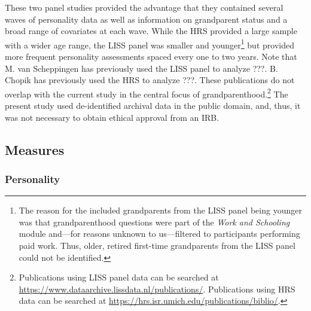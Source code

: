 \documentclass[
  english,
  man, noextraspace]{apa7}
\begin{document}
These two panel studies provided the advantage that they contained several waves of personality data as well as information on grandparent status and a broad range of covariates at each wave. While the HRS provided a large sample with a wider age range, the LISS panel was smaller and younger\footnote{The reason for the included grandparents from the LISS panel being younger was that grandparenthood questions were part of the \emph{Work and Schooling} module and---for reasons unknown to us---filtered to participants performing paid work. Thus, older, retired first-time grandparents from the LISS panel could not be identified.} but provided more frequent personality assessments spaced every one to two years. Note that M. van Scheppingen has previously used the LISS panel to analyze ???. B. Chopik has previously used the HRS to analyze ???. These publications do not overlap with the current study in the central focus of grandparenthood.\footnote{Publications using LISS panel data can be searched at \url{https://www.dataarchive.lissdata.nl/publications/}. Publications using HRS data can be searched at \url{https://hrs.isr.umich.edu/publications/biblio/}.} The present study used de-identified archival data in the public domain, and, thus, it was not necessary to obtain ethical approval from an IRB.

\hypertarget{measures}{%
\subsection{Measures}\label{measures}}

\hypertarget{personality}{%
\subsubsection{Personality}\label{personality}}
\end{document}
